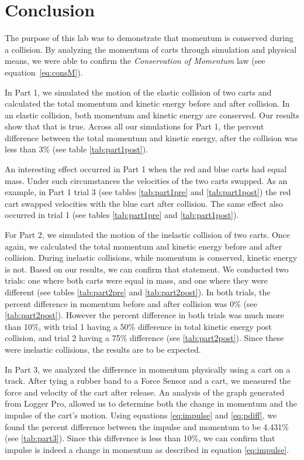 
\section{Conclusion}

\vspace{-0.5cm}
\singlespacing

The purpose of this lab was to demonstrate that momentum is conserved during a collision. By analyzing the momentum of carts through simulation and physical means, we were able to confirm the \textit{Conservation of Momentum} law (see equation~\ref{eq:consM}).

In Part 1, we simulated the motion of the elastic collision of two carts and calculated the total momentum and kinetic energy before and after collision. In an elastic collision, both momentum and kinetic energy are conserved. Our results show that that is true. Across all our simulations for Part 1, the percent difference between the total momentum and kinetic energy, after the collision was less than 3\% (see table \ref{tab:part1post}). 

An interesting effect occurred in Part 1 when the red and blue carts had equal mass. Under such circumstances the velocities of the two carts swapped. As an example, in Part 1 trial 3 (see tables \ref{tab:part1pre} and \ref{tab:part1post}) the red cart swapped velocities with the blue cart after collision. The same effect also occurred in trial 1 (see tables \ref{tab:part1pre} and \ref{tab:part1post}). 

For Part 2, we simulated the motion of the inelastic collision of two carts. Once again, we calculated the total momentum and kinetic energy before and after collision. During inelastic collisions, while momentum is conserved, kinetic energy is not. Based on our results, we can confirm that statement. We conducted two trials: one where both carts were equal in mass, and one where they were different (see tables \ref{tab:part2pre} and \ref{tab:part2post}). In both trials, the percent difference in momentum before and after collision was 0\% (see \ref{tab:part2post}). However the percent difference in both trials was much more than 10\%, with trial 1 having a 50\% difference in total kinetic energy post collision, and trial 2 having a 75\% difference (see \ref{tab:part2post}). Since these were inelastic collisions,  the results are to be expected. 

In Part 3, we analyzed the difference in momentum physically using a cart on a track. After tying a rubber band to a Force Sensor and a cart, we measured the force and velocity of the cart after release. An analysis of the graph generated from Logger Pro, allowed us to determine both the change in momentum and the impulse of the cart's motion. Using equations \ref{eq:impulse} and \ref{eq:pdiff}, we found the percent difference between the impulse and momentum to be 4.431\% (see \ref{tab:part3}). Since this difference is less than 10\%, we can confirm that impulse is indeed a change in momentum as described in equation \ref{eq:impulse}. 
